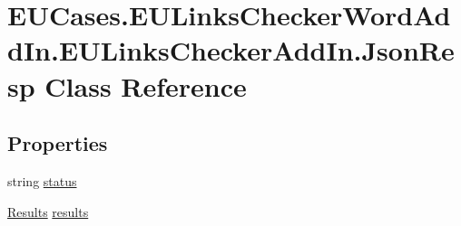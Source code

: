 \hypertarget{class_e_u_cases_1_1_e_u_links_checker_word_add_in_1_1_e_u_links_checker_add_in_1_1_json_resp}{\section{E\+U\+Cases.\+E\+U\+Links\+Checker\+Word\+Add\+In.\+E\+U\+Links\+Checker\+Add\+In.\+Json\+Resp Class Reference}
\label{class_e_u_cases_1_1_e_u_links_checker_word_add_in_1_1_e_u_links_checker_add_in_1_1_json_resp}
}
\subsection*{Properties}
\begin{DoxyCompactItemize}
\item 
string \hyperlink{class_e_u_cases_1_1_e_u_links_checker_word_add_in_1_1_e_u_links_checker_add_in_1_1_json_resp_abdeeb96e5f45d561b168d83ef5fcc549}{status}
\item 
\hyperlink{class_e_u_cases_1_1_e_u_links_checker_word_add_in_1_1_e_u_links_checker_add_in_1_1_results}{Results} \hyperlink{class_e_u_cases_1_1_e_u_links_checker_word_add_in_1_1_e_u_links_checker_add_in_1_1_json_resp_ac58a148663d1611aceec323b92401162}{results}
\end{DoxyCompactItemize}



